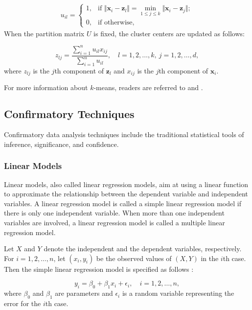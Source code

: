 \documentclass[]{book}
\theoremstyle{definition}
\theoremstyle{definition}
\theoremstyle{definition}
\theoremstyle{remark}
\begin{document}
\[\begin{aligned}u_{il}=\left\{
\begin{array}{ll}
1, & \text{if } \Vert \textbf{x}_i - \textbf{z}_l\Vert = \min_{1\le j\le k} \Vert \textbf{x}_i - \textbf{z}_j\Vert;\\
0, & \text{if otherwise,}
\end{array}
\right.
\end{aligned}\] When the partition matrix \(U\) is fixed, the cluster
centers are updated as follows:

\[z_{lj} = \dfrac{\sum_{i=1}^n u_{il} x_{ij} } { \sum_{i=1}^n u_{il}},\quad l=1,2,\ldots,k,\: j=1,2,\ldots,d,\]
where \(z_{lj}\) is the \(j\)th component of \(\textbf{z}_l\) and
\(x_{ij}\) is the \(j\)th component of \(\textbf{x}_i\).

For more information about \(k\)-means, readers are referred to
\citep{gan2007} and \citep{mirkin2011}.

\subsection{Confirmatory Techniques}\label{confirmatory-techniques}

Confirmatory data analysis techniques include the traditional
statistical tools of inference, significance, and confidence.

\subsubsection{Linear Models}\label{linear-models}

Linear models, also called linear regression models, aim at using a
linear function to approximate the relationship between the dependent
variable and independent variables. A linear regression model is called
a simple linear regression model if there is only one independent
variable. When more than one independent variables are involved, a
linear regression model is called a multiple linear regression model.

Let \(X\) and \(Y\) denote the independent and the dependent variables,
respectively. For \(i=1,2,\ldots,n\), let \((x_i, y_i)\) be the observed
values of \((X,Y)\) in the \(i\)th case. Then the simple linear
regression model is specified as follows \citep{frees2009}:

\[y_i  = \beta_0 + \beta_1 x_i + \epsilon_i,\quad i=1,2,\ldots,n,\]
where \(\beta_0\) and \(\beta_1\) are parameters and \(\epsilon_i\) is a
random variable representing the error for the \(i\)th case.
\end{document}
